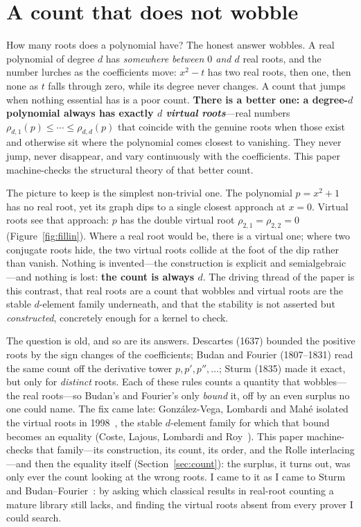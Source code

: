 \documentclass[11pt]{article}
\begin{document}
\section{A count that does not wobble}\label{sec:intro}

How many roots does a polynomial have? The honest answer wobbles. A real polynomial of degree $d$ has
\emph{somewhere between $0$ and $d$} real roots, and the number lurches as the coefficients move:
$x^2-t$ has two real roots, then one, then none as $t$ falls through zero, while its degree never
changes. A count that jumps when nothing essential has is a poor count. \textbf{There is a better one:
a degree-$d$ polynomial always has exactly $d$ \emph{virtual roots}}---real numbers
$\rho_{d,1}(p)\le\cdots\le\rho_{d,d}(p)$ that coincide with the genuine roots when those exist and
otherwise sit where the polynomial comes closest to vanishing. They never jump, never disappear, and
vary continuously with the coefficients. This paper machine-checks the structural theory of that
better count.

The picture to keep is the simplest non-trivial one. The polynomial $p=x^2+1$ has no real root, yet
its graph dips to a single closest approach at $x=0$. Virtual roots see that approach: $p$ has the
double virtual root $\rho_{2,1}=\rho_{2,2}=0$ (Figure~\ref{fig:fillin}). Where a real root would be,
there is a virtual one; where two conjugate roots hide, the two virtual roots collide at the foot of
the dip rather than vanish. Nothing is invented---the construction is explicit and
semialgebraic---and nothing is lost: \textbf{the count is always $d$}. The driving thread of the paper
is this contrast, that real roots are a count that wobbles and virtual roots are the stable
$d$-element family underneath, and that the stability is not asserted but \emph{constructed},
concretely enough for a kernel to check.

The question is old, and so are its answers. Descartes (1637) bounded the positive roots by the sign
changes of the coefficients; Budan and Fourier (1807--1831) read the same count off the derivative
tower $p,p',p'',\dots$; Sturm (1835) made it exact, but only for \emph{distinct} roots. Each of these
rules counts a quantity that wobbles---the real roots---so Budan's and Fourier's only \emph{bound} it,
off by an even surplus no one could name. The fix came late: Gonz\'alez-Vega, Lombardi and Mah\'e
isolated the virtual roots in 1998~\cite{glm}, the stable $d$-element family for which that bound
becomes an equality (Coste, Lajous, Lombardi and Roy~\cite{coste}). This paper machine-checks that
family---its construction, its count, its order, and the Rolle interlacing---and then the equality
itself (Section~\ref{sec:count}): the surplus, it turns out, was only ever the count looking at the
wrong roots. I came to it as I came to Sturm~\cite{sturmlean} and Budan--Fourier~\cite{bflean}: by
asking which classical results in real-root counting a mature library still lacks, and finding the
virtual roots absent from every prover I could search.
\end{document}
